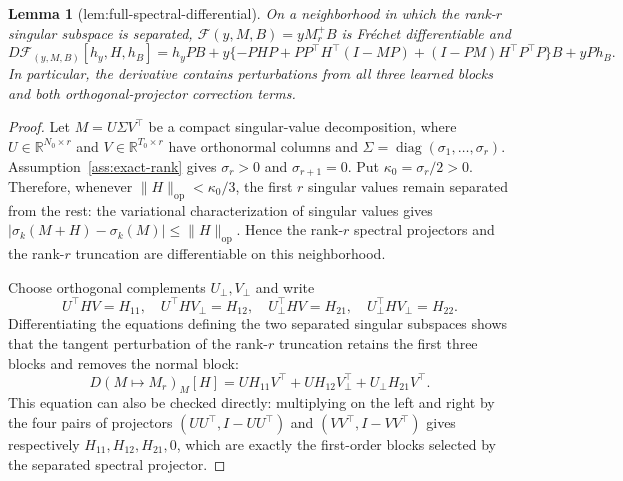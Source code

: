 \documentclass{article}
\newtheorem{lemma}{Lemma}
\begin{document}
\begin{lemma}[lem:full-spectral-differential]\label{lem:full-spectral-differential}
On a neighborhood in which the rank-\(r\) singular subspace is separated, \(\mathcal F(y,M,B)=yM_r^+B\) is Fr\'echet differentiable and \[D\mathcal F_{(y,M,B)}[h_y,H,h_B]=h_yPB+y\{-PHP+PP^\top H^\top(I-MP)+(I-PM)H^\top P^\top P\}B+yPh_B.\] In particular, the derivative contains perturbations from all three learned blocks and both orthogonal-projector correction terms.
\end{lemma}
\begin{proof}
Let \(M=U\Sigma V^\top\) be a compact singular-value decomposition, where \(U\in\mathbb R^{N_0\times r}\) and \(V\in\mathbb R^{T_0\times r}\) have orthonormal columns and \(\Sigma=\operatorname{diag}(\sigma_1,\ldots,\sigma_r)\).  Assumption~\ref{ass:exact-rank} gives \(\sigma_r>0\) and \(\sigma_{r+1}=0\).  Put \(\kappa_0=\sigma_r/2>0\).  Therefore, whenever \(\|H\|_{\mathrm{op}}<\kappa_0/3\), the first \(r\) singular values remain separated from the rest: the variational characterization of singular values gives \(|\sigma_k(M+H)-\sigma_k(M)|\le\|H\|_{\mathrm{op}}\).  Hence the rank-\(r\) spectral projectors and the rank-\(r\) truncation are differentiable on this neighborhood.

Choose orthogonal complements \(U_\perp,V_\perp\) and write
\[
 U^\top H V=H_{11},\quad U^\top H V_\perp=H_{12},\quad
 U_\perp^\top H V=H_{21},\quad U_\perp^\top H V_\perp=H_{22}.
\]
Differentiating the equations defining the two separated singular subspaces shows that the tangent perturbation of the rank-\(r\) truncation retains the first three blocks and removes the normal block:
\[
 D(M\mapsto M_r)_M[H]
 =UH_{11}V^\top+UH_{12}V_\perp^\top+U_\perp H_{21}V^\top.
\]
This equation can also be checked directly: multiplying on the left and right by the four pairs of projectors \((UU^\top,I-UU^\top)\) and \((VV^\top,I-VV^\top)\) gives respectively \(H_{11},H_{12},H_{21},0\), which are exactly the first-order blocks selected by the separated spectral projector.


\end{proof}
\end{document}
